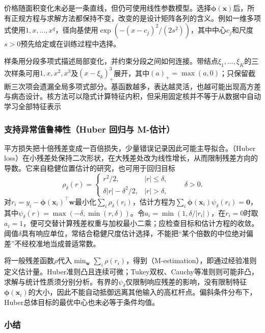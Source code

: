 价格随面积变化未必是一条直线，但仍可使用线性参数模型。选择$\bm{\phi}(\bm{x})$后，所有正规方程与求解方法都保持不变，改变的是设计矩阵各列的含义。例如一维多项式使用$1,x,\ldots,x^q$，径向基使用$\exp(-(x-c_j)^2/(2s^2))$，其中中心$c_j$和尺度$s>0$预先给定或在训练过程中选择。

样条用分段多项式描述局部变化，并约束分段之间如何连接。带结点$\xi_1,\ldots,\xi_K$的三次样条可用$1,x,x^2,x^3$及$(x-\xi_k)_+^3$展开，其中$(a)_+=\max(a,0)$；只保留截断三次项会遗漏全局多项式部分。基函数越多，表达越灵活，也越可能出现高方差与病态设计。核方法可以隐式计算特征内积，但采用固定核并不等于从数据中自动学习全部特征表示

\subsubsection{支持异常值鲁棒性（Huber 回归与 M-估计）}
\label{sec:regression-huber}

平方损失把十倍残差变成一百倍损失，少量错误记录因此可能主导拟合。（Huber loss）在小残差处保持二次形状，在大残差处改为线性增长，从而限制残差方向的导数。它来自稳健位置估计的研究，也可用于回归目标
\begin{equation}
  \rho_\delta(r)=
  \begin{cases}
    r^2/2,&|r|\leq\delta,\\
    \delta|r|-\delta^2/2,&|r|>\delta,
  \end{cases}
  \qquad\delta>0.
  \label{eq:regression-huber-loss}
\end{equation}
对$r_i=y_i-\bm{\phi}(\bm{x}_i)^{\top}\bm{w}$最小化$\sum_i\rho_\delta(r_i)$，估计方程为$\sum_i\bm{\phi}(\bm{x}_i)\psi_\delta(r_i)=\bm{0}$，其中$\psi_\delta(r)=\max(-\delta,\min(r,\delta))$。令$a_i=\min(1,\delta/|r_i|)$，在$r_i=0$时取$a_i=1$，便可交替计算残差权重与加权最小二乘；应检查目标和估计方程的收敛。阈值$\delta$具有响应单位，常结合稳健尺度估计选择，不能把“某个倍数的中位绝对偏差”不经校准地当成普适常数。

将一般残差函数$\rho$代入$\min_{\bm{w}}\sum_i\rho(r_i)$，得到（M-estimation），即通过经验准则定义估计量。Huber准则凸且连续可微；Tukey双权、Cauchy等准则则可能非凸，求解与统计性质须分别分析。有界的$\psi_\delta$仅限制响应残差的影响，没有限制特征$\bm{\phi}(\bm{x}_i)$的大小，因此不能自动抵御远离其他输入的高杠杆点。偏斜条件分布下，Huber总体目标的最优中心也未必等于条件均值。

\subsubsection{小结}

